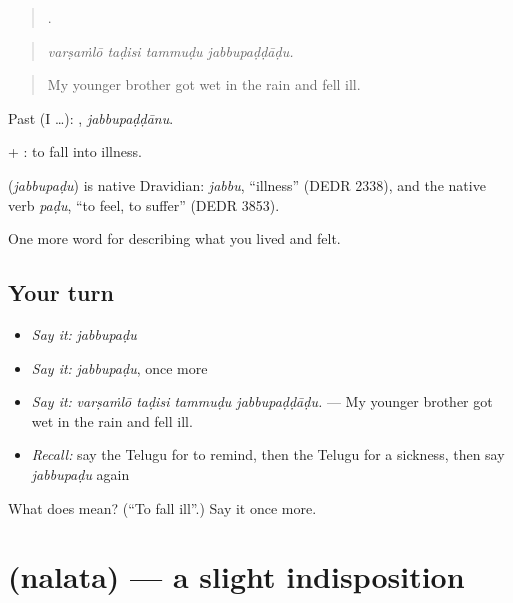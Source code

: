 \begin{quote}
   .
\end{quote}

\begin{quote}
\emph{varṣaṁlō taḍisi tammuḍu jabbupaḍḍāḍu.}
\end{quote}

\begin{quote}
My younger brother got wet in the rain and fell ill.
\end{quote}

Past (I …): , \emph{jabbupaḍḍānu}.

 + : to fall into illness.

\begin{cousinweb}
\textbf{} (\emph{jabbupaḍu}) is native Dravidian: \emph{jabbu}, \textquotedblleft{}illness\textquotedblright{} (DEDR 2338), and the native verb \emph{paḍu}, \textquotedblleft{}to feel, to suffer\textquotedblright{} (DEDR 3853).
\end{cousinweb}

\begin{grammarlens}[title={What you've built}]
One more word for describing what you lived and felt.
\end{grammarlens}

\subsection*{Your turn}
\begin{itemize}
\raggedright
  \item \emph{Say it:} \emph{jabbupaḍu}
  \item \emph{Say it:} \emph{jabbupaḍu}, once more
  \item \emph{Say it:} \emph{varṣaṁlō taḍisi tammuḍu jabbupaḍḍāḍu.} — My younger brother got wet in the rain and fell ill.
  \item \emph{Recall:} say the Telugu for to remind, then the Telugu for a sickness, then say \emph{jabbupaḍu} again
\end{itemize}

\begin{tcolorbox}[breakable,colback=teal!4,colframe=teal!35!black,title={Before you move on}]
What does  mean? (\textquotedblleft{}To fall ill\textquotedblright{}.) Say it once more.
\end{tcolorbox}
\section[\texorpdfstring{\te{నలత} (nalata)}{నలత (nalata)}]{ (nalata) — a slight indisposition}

